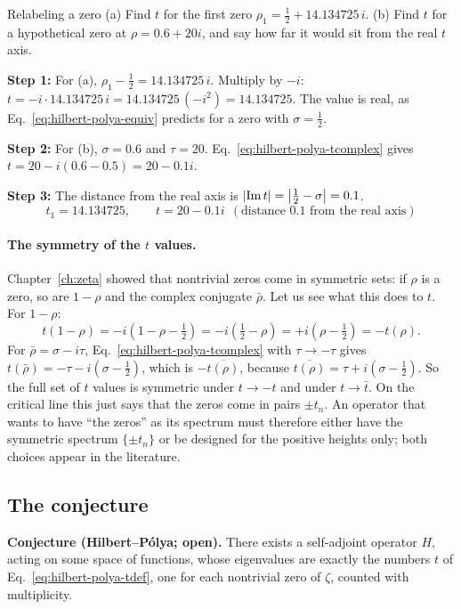 \begin{sample}{Relabeling a zero}
(a) Find $t$ for the first zero $\rho_1=\tfrac12+14.134725\,i$. (b) Find $t$ for a hypothetical zero at $\rho=0.6+20i$, and say how far it would sit from the real $t$ axis.

\textbf{Step 1:} For (a), $\rho_1-\tfrac12=14.134725\,i$. Multiply by $-i$: $t=-i\cdot 14.134725\,i=14.134725\,(-i^2)=14.134725$. The value is real, as Eq.~\eqref{eq:hilbert-polya-equiv} predicts for a zero with $\sigma=\tfrac12$.

\textbf{Step 2:} For (b), $\sigma=0.6$ and $\tau=20$. Eq.~\eqref{eq:hilbert-polya-tcomplex} gives $t=20-i(0.6-0.5)=20-0.1i$.

\textbf{Step 3:} The distance from the real axis is $\left\lvert \operatorname{Im} t\right\rvert=\left\lvert \tfrac12-\sigma\right\rvert=0.1$.
\[
\boxed{t_1=14.134725,\qquad t=20-0.1i\ \ (\text{distance }0.1\text{ from the real axis})}
\]
\end{sample}

\paragraph{The symmetry of the $t$ values.} Chapter~\ref{ch:zeta} showed that nontrivial zeros come in symmetric sets: if $\rho$ is a zero, so are $1-\rho$ and the complex conjugate $\bar\rho$. Let us see what this does to $t$. For $1-\rho$:
\begin{equation}
t(1-\rho)=-i\left(1-\rho-\tfrac12\right)=-i\left(\tfrac12-\rho\right)=+i\left(\rho-\tfrac12\right)=-t(\rho).
\end{equation}
For $\bar\rho=\sigma-i\tau$, Eq.~\eqref{eq:hilbert-polya-tcomplex} with $\tau\to-\tau$ gives $t(\bar\rho)=-\tau-i(\sigma-\tfrac12)$, which is $-\overline{t(\rho)}$, because $\overline{t(\rho)}=\tau+i(\sigma-\tfrac12)$. So the full set of $t$ values is symmetric under $t\to-t$ and under $t\to\bar t$. On the critical line this just says that the zeros come in pairs $\pm t_n$. An operator that wants to have ``the zeros'' as its spectrum must therefore either have the symmetric spectrum $\{\pm t_n\}$ or be designed for the positive heights only; both choices appear in the literature.

\subsection{The conjecture}

\medskip\noindent\textbf{Conjecture (Hilbert--P\'olya; open).} There exists a self-adjoint operator $H$, acting on some space of functions, whose eigenvalues are exactly the numbers $t$ of Eq.~\eqref{eq:hilbert-polya-tdef}, one for each nontrivial zero of $\zeta$, counted with multiplicity.

